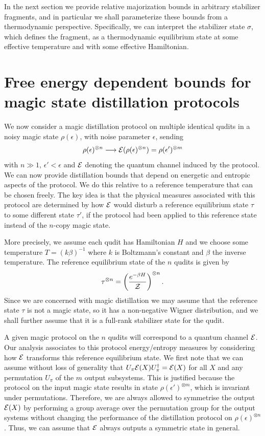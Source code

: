 \documentclass[pra,
aps,
twocolumn,
superscriptaddress,
groupedaddress,
nofootinbib,
reprint
]{revtex4-1}
\begin{document}
In the next section we provide relative majorization bounds in arbitrary stabilizer fragments, and in particular we shall parameterize these bounds from a thermodynamic perspective. Specifically, we can interpret the stabilizer state $\sigma$, which defines the fragment, as a thermodynamic equilibrium state at some effective temperature and with some effective Hamiltonian.

\section{Free energy dependent bounds for magic state distillation protocols}
\label{sec:stab}

We now consider a magic distillation protocol on multiple identical qudits in a noisy magic state $\rho(\epsilon)$, with noise parameter $\epsilon$, sending 
\begin{equation}
\rho(\epsilon)^{\otimes n} \longrightarrow {\mathcal E}(\rho(\epsilon)^{\otimes n}) =\rho(\epsilon')^{\otimes m}
\end{equation}
with $n \gg 1$, $\epsilon' <\epsilon$ and ${\mathcal E}$ denoting the quantum channel induced by the protocol. We can now provide distillation bounds that depend on energetic and entropic aspects of the protocol. We do this relative to a reference temperature that can be chosen freely. The key idea is that the physical measures associated with this protocol are determined by how ${\mathcal E}$ would disturb a reference equilibrium state $\tau$ to some different state $\tau'$, if the protocol had been applied to this reference state instead of the $n$-copy magic state. 

More precisely, we assume each qudit has Hamiltonian $H$ and we choose some temperature $T = (k\beta)^{-1}$ where $k$ is Boltzmann's constant and $\beta$ the inverse temperature. The reference equilibrium state of the $n$ qudits is given by
\begin{equation}
\tau^{\otimes n} = \left ( \frac{e^{-\beta H}}{\mathcal{Z}} \right )  ^{\otimes n}.
\end{equation}
Since we are concerned with magic distillation we may assume that the reference state $\tau$ is not a magic state, so it has a non-negative Wigner distribution, and we shall further assume that it is a full-rank stabilizer state for the qudit. 

A given magic protocol on the $n$ qudits will correspond to a quantum channel ${\mathcal E}$. Our analysis associates to this protocol energy/entropy measures by considering how ${\mathcal E}$ transforms this reference equilibrium state. We first note that we can assume without loss of generality that $U_\pi{\mathcal E}(X) U_\pi^\dagger = {\mathcal E}(X)$ for all $X$ and any permutation $U_\pi$ of the $m$ output subsystems. This is justified because the protocol on the input magic state results in state $\rho(\epsilon')^{\otimes m}$, which is invariant under permutations. Therefore, we are always allowed to symmetrise the output ${\mathcal E}(X)$ by performing a group average over the permutation group for the output systems without changing the performance of the distillation protocol on $\rho(\epsilon)^{\otimes n}$. Thus, we can assume that ${\mathcal E}$ always outputs a symmetric state in general.
\end{document}
